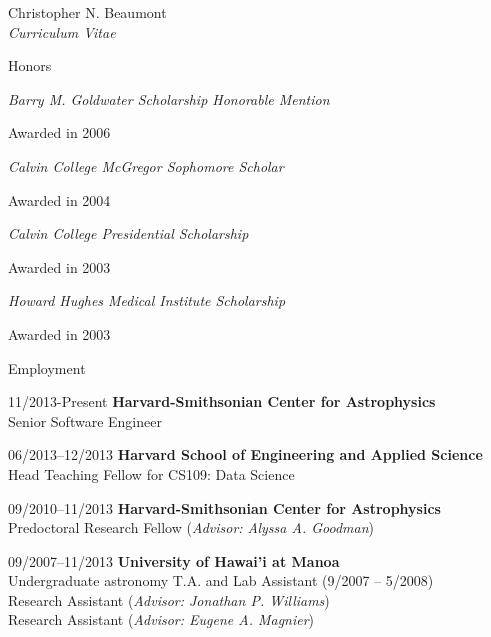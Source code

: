 \documentclass[10pt]{article}
\newenvironment{sublist}{%
	\begin{list}{}{%
		\setlength{\itemsep}{0em}\setlength{\parsep}{0em}%
		\setlength{\topsep}{0em}\setlength{\parskip}{0em}%
	}%
}%
{ \end{list} }
\begin{document}
\begin{cv}{Christopher N. Beaumont\\{\large \itshape Curriculum Vitae}}
\begin{cvlist}{Honors}
\item
	\emph{Barry M. Goldwater Scholarship Honorable Mention}
	\begin{sublist}
	\item Awarded in 2006
	\end{sublist}

\item
	\emph{Calvin College McGregor Sophomore Scholar}
	\begin{sublist}
	\item Awarded in 2004
	\end{sublist}

\item
	\emph{Calvin College Presidential Scholarship}
	\begin{sublist}
	\item Awarded in 2003
	\end{sublist}

\item
	\emph{Howard Hughes Medical Institute Scholarship}
	\begin{sublist}
	\item Awarded in 2003
	\end{sublist}


\end{cvlist}


\begin{cvlist}{Employment}

	\item[11/2013-Present] \textbf{Harvard-Smithsonian Center for Astrophysics} \\
	Senior Software Engineer

	\item[06/2013--12/2013] \textbf{Harvard School of Engineering and Applied Science} \\
	Head Teaching Fellow for CS109: Data Science \\

	\item[09/2010--11/2013] \textbf{Harvard-Smithsonian Center for Astrophysics} \\
	Predoctoral Research Fellow (\emph{Advisor: Alyssa A. Goodman}) \\
	
	\item[09/2007--11/2013] \textbf{University of Hawai'i at Manoa} \\
	Undergraduate astronomy T.A. and Lab Assistant (9/2007 -- 5/2008) \\
	Research Assistant (\emph{Advisor: Jonathan P. Williams}) \\
	Research Assistant (\emph{Advisor: Eugene A. Magnier}) \\


\end{cvlist}
\end{cv}
\end{document}
